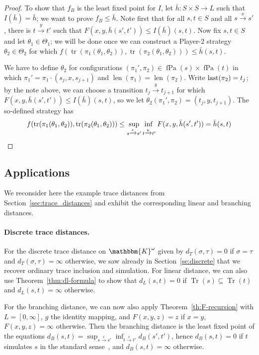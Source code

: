 \documentclass[copyright,creativecommons,sharealike]{eptcs}
\theoremstyle{plain}
\newcommand*\Strat{\Theta}
\renewcommand*\K{\mathbbm{K}}
\DeclareMathOperator{\Tr}{Tr} \DeclareMathOperator{\Pa}{Pa} \DeclareMathOperator{\fPa}{fPa} \DeclareMathOperator{\tr}{tr} \DeclareMathOperator{\len}{len} \newcommand*\bigmid{\mathrel{\big|}}
\newcommand*\tto[1]{\xrightarrow{#1}}
\newcommand*\last{\textup{last}} \newcommand{\Round}[1]{\ensuremath{\textup{Round}_{(#1)}}\xspace}
\begin{document}
\begin{proof}
  To show that $f_B$ is the least fixed point for $I$, let $\bar h:
  S\times S\to L$ such that $I( \bar h)= \bar h$; we want to prove
  $f_B\le \bar h$.  Note first that for all $s, t\in S$ and all $s\tto
  x s'$, there is $t\tto y t'$ such that $F( x, y, \bar h( s', t'))\le
  I( \bar h)( s, t)$.  Now fix $s, t\in S$ and let $\theta_1\in
  \Strat_1$; we will be done once we can construct a Player-2 strategy
  $\theta_2\in \Strat_2$ for which $f( \tr( \pi_1( \theta_1,
  \theta_2)), \tr( \pi_2( \theta_1, \theta_2)))\le \bar h( s, t)$.

  We have to define $\theta_2$ for configurations $( \pi_1', \pi_2)\in
  \fPa( s)\times \fPa( t)$ in which $\pi_1'= \pi_1\cdot( s_j, x, s_{
    j+ 1})$ and $\len( \pi_1)= \len( \pi_2)$.  Write $\last( \pi_2)=
  t_j$; by the note above, we can choose a transition $t_j\tto y t_{
    j+ 1}$ for which $F( x, y, \bar h( s', t'))\le I( \bar h)( s, t)$,
  so we let $\theta_2( \pi_1', \pi_2)=( t_j, y, t_{ j+ 1})$.  The
  so-defined strategy has
  \begin{equation*}
    f( \tr( \pi_1( \theta_1, \theta_2)), \tr(
    \pi_2( \theta_1, \theta_2)))\le \adjustlimits \sup_{s\tto{x}s'}
    \inf_{t\tto{y}t'}F( x, y, \bar h( s', t'))= \bar h( s, t)
  \end{equation*}
\end{proof}

\subsection{Applications}
\label{se:applications}

We reconsider here the example trace distances from
Section~\ref{sec:trace_distances} and exhibit the corresponding linear
and branching distances.

\paragraph{Discrete trace distances.}

For the discrete trace distance on $\K^\omega$ given by $d_T( \sigma,
\tau)= 0$ if $\sigma= \tau$ and $d_T( \sigma, \tau)= \infty$
otherwise, we saw already in Section~\ref{se:discrete} that we recover
ordinary trace inclusion and simulation.  For linear distance, we can
also use Theorem~\ref{thm:dl-formula} to show that $d_L( s, t)= 0$ if
$\Tr( s)\subseteq \Tr( t)$ and $d_L( s, t)= \infty$ otherwise.

For the branching distance, we can now also apply
Theorem~\ref{th:F-recursion} with $L=[ 0, \infty]$, $g$ the identity
mapping, and $F( x, y, z)= z$ if $x= y$, $F( x, y, z)= \infty$
otherwise.  Then the branching distance is the least fixed point of
the equations $d_B( s, t)= \sup_{ s\tto x s'} \inf_{ t\tto x t'} d_B(
s', t')$, hence $d_B( s, t)= 0$ if $t$ simulates $s$ in the standard
sense~\cite{milner89}, and $d_B( s, t)= \infty$ otherwise.
\end{document}
